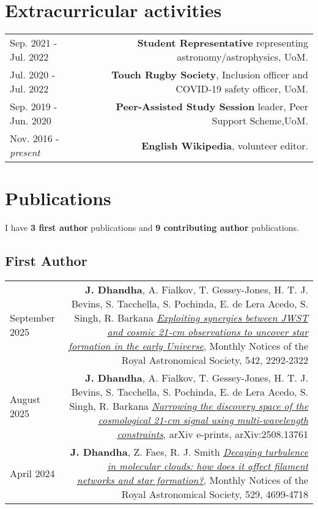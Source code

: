 \documentclass{article}
\begin{document}
\section*{Extracurricular activities}
\begin{longtable}{L!{\vrule}R}

  Sep. 2021 - Jul. 2022 & \textbf{Student Representative} representing astronomy/astrophysics, UoM. \\

  Jul. 2020 - Jul. 2022 & \textbf{Touch Rugby Society}, Inclusion officer and COVID-19 safety officer, UoM. \\

	Sep. 2019 - Jun. 2020 & \textbf{Peer-Assisted Study Session} leader, Peer Support Scheme,UoM. \\

	Nov. 2016 - \textit{present} & \textbf{English Wikipedia}, volunteer editor. \\
\end{longtable}


\section*{Publications}

I have \textbf{3 first author} publications and \textbf{9 contributing author} publications.

\subsection*{First Author}

\begin{longtable}{L!{\vrule}R}
    September 2025 &
    \textbf{J. Dhandha}, A. Fialkov, T. Gessey-Jones, H. T. J. Bevins, S. Tacchella, S. Pochinda, E. de Lera Acedo, S. Singh, R. Barkana
    \href{https://ui.adsabs.harvard.edu/abs/2025MNRAS.542.2292D}{\textit{Exploiting synergies between JWST and cosmic 21-cm observations to uncover star formation in the early Universe}},
    Monthly Notices of the Royal Astronomical Society, 542, 2292-2322 \\

    August 2025 &
    \textbf{J. Dhandha}, A. Fialkov, T. Gessey-Jones, H. T. J. Bevins, S. Tacchella, S. Pochinda, E. de Lera Acedo, S. Singh, R. Barkana
    \href{https://ui.adsabs.harvard.edu/abs/2025arXiv250813761D}{\textit{Narrowing the discovery space of the cosmological 21-cm signal using multi-wavelength constraints}},
    arXiv e-prints, arXiv:2508.13761 \\

    April 2024 &
    \textbf{J. Dhandha}, Z. Faes, R. J. Smith
    \href{https://ui.adsabs.harvard.edu/abs/2024MNRAS.529.4699D}{\textit{Decaying turbulence in molecular clouds: how does it affect filament networks and star formation?}},
    Monthly Notices of the Royal Astronomical Society, 529, 4699-4718 \\
\end{longtable}
\end{document}
